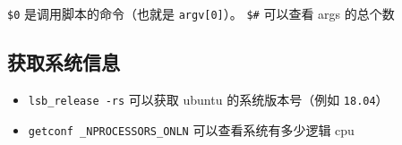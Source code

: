\verb|$0| 是调用脚本的命令（也就是 \verb|argv[0]|）。 \verb|$#| 可以查看 args 的总个数

\subsection{获取系统信息}
\begin{itemize}
\item \verb`lsb_release -rs` 可以获取 ubuntu 的系统版本号（例如 \verb|18.04|）
\item \verb|getconf _NPROCESSORS_ONLN| 可以查看系统有多少逻辑 cpu
\end{itemize}
